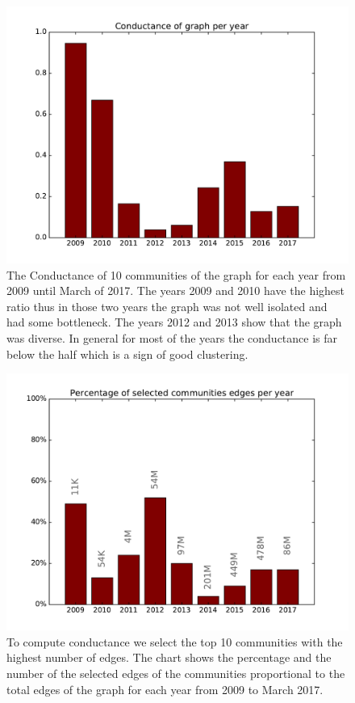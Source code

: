 \begin{figure}[h!]
    \includegraphics[width=1\linewidth]{./images/conductance}
	\centering
	\caption{The Conductance of 10 communities of the graph for each year from 2009 until March of 2017. The years 2009 and 2010 have the highest ratio thus in those two years the graph was not well isolated and had some bottleneck. The years 2012 and 2013 show that the graph was diverse. In general for most of the years the conductance is far below the half which is a sign of good clustering.}
	\label{fig:fig6}
\end{figure}

\begin{figure}[h!]
    \includegraphics[width=1\linewidth]{./images/edgePercentage}
	\centering
	\caption{To compute conductance we select the top 10 communities with the highest number of edges. The chart shows the percentage and the number of the selected edges of the communities proportional to the total edges of the graph for each year from 2009 to March 2017.}
	\label{fig:fig7}
\end{figure}






